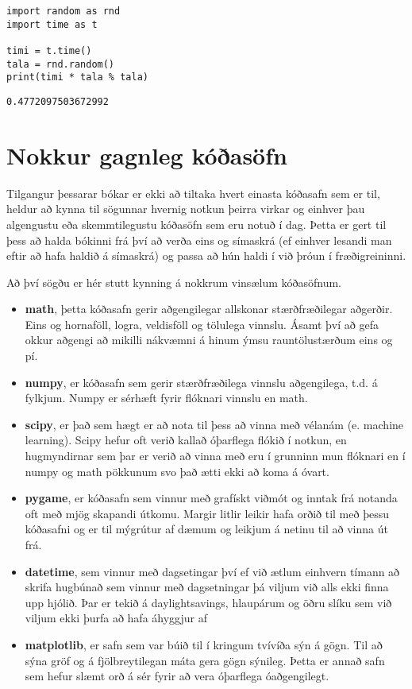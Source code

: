 \begin{lstlisting}[caption=Lykilorði as, label=lst:kóðasöfn-as]
import random as rnd
import time as t

timi = t.time() 
tala = rnd.random()
print(timi * tala % tala)
\end{lstlisting}
\lstset{style=uttak}
\begin{lstlisting}
0.4772097503672992
\end{lstlisting}
\lstset{style=venjulegt}

\section{Nokkur gagnleg kóðasöfn}\label{uk:kóðasöfn-gagnleg}
Tilgangur þessarar bókar er ekki að tiltaka hvert einasta kóðasafn sem er til, heldur að kynna til sögunnar hvernig notkun þeirra virkar og einhver þau algengustu eða skemmtilegustu kóðasöfn sem eru notuð í dag.
Þetta er gert til þess að halda bókinni frá því að verða eins og símaskrá (ef einhver lesandi man eftir að hafa haldið á símaskrá) og passa að hún haldi í við þróun í fræðigreininni.

Að því sögðu er hér stutt kynning á nokkrum vinsælum kóðasöfnum.

\begin{itemize}
	\item \textbf{math}, þetta kóðasafn gerir aðgengilegar allskonar stærðfræðilegar aðgerðir.
	Eins og hornaföll, logra, veldisföll og tölulega vinnslu.
	Ásamt því að gefa okkur aðgengi að mikilli nákvæmni á hinum ýmsu rauntölustærðum eins og pí.
	\item \textbf{numpy}, er kóðasafn sem gerir stærðfræðilega vinnslu aðgengilega, t.d. á fylkjum.
	Numpy er sérhæft fyrir flóknari vinnslu en math.
	\item \textbf{scipy}, er það sem hægt er að nota til þess að vinna með vélanám (e. machine learning).
	Scipy hefur oft verið kallað óþarflega flókið í notkun, en hugmyndirnar sem þar er verið að vinna með eru í grunninn mun flóknari en í numpy og math pökkunum svo það ætti ekki að koma á óvart.
	\item \textbf{pygame}, er kóðasafn sem vinnur með grafískt viðmót og inntak frá notanda oft með mjög skapandi útkomu.
	Margir litlir leikir hafa orðið til með þessu kóðasafni og er til mýgrútur af dæmum og leikjum á netinu til að vinna út frá.
	\item \textbf{datetime}, sem vinnur með dagsetingar því ef við ætlum einhvern tímann að skrifa hugbúnað sem vinnur með dagsetningar þá viljum við alls ekki finna upp hjólið.
	Þar er tekið á daylightsavings, hlaupárum og öðru slíku sem við viljum ekki þurfa að hafa áhyggjur af
	\item \textbf{matplotlib}, er safn sem var búið til í kringum tvívíða sýn á gögn.
	Til að sýna gröf og á fjölbreytilegan máta gera gögn sýnileg.
	Þetta er annað safn sem hefur slæmt orð á sér fyrir að vera óþarflega óaðgengilegt.
\end{itemize}

